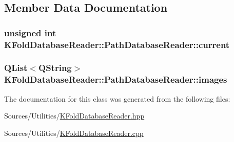 \subsection{Member Data Documentation}
\hypertarget{class_k_fold_database_reader_1_1_path_database_reader_a2e6d3113ba8d5a4d1f48103a9219fcc7}{
\subsubsection[{current}]{\setlength{\rightskip}{0pt plus 5cm}unsigned int K\+Fold\+Database\+Reader\+::\+Path\+Database\+Reader\+::current\hspace{0.3cm}{\ttfamily [private]}}}\label{class_k_fold_database_reader_1_1_path_database_reader_a2e6d3113ba8d5a4d1f48103a9219fcc7}
\hypertarget{class_k_fold_database_reader_1_1_path_database_reader_a9b8942b3921fcc44a115fb1d4eb6b49c}{
\subsubsection[{images}]{\setlength{\rightskip}{0pt plus 5cm}Q\+List$<$Q\+String$>$ K\+Fold\+Database\+Reader\+::\+Path\+Database\+Reader\+::images\hspace{0.3cm}{\ttfamily [private]}}}\label{class_k_fold_database_reader_1_1_path_database_reader_a9b8942b3921fcc44a115fb1d4eb6b49c}


The documentation for this class was generated from the following files\+:\begin{DoxyCompactItemize}
\item 
Sources/\+Utilities/\hyperlink{_k_fold_database_reader_8hpp}{K\+Fold\+Database\+Reader.\+hpp}\item 
Sources/\+Utilities/\hyperlink{_k_fold_database_reader_8cpp}{K\+Fold\+Database\+Reader.\+cpp}\end{DoxyCompactItemize}
